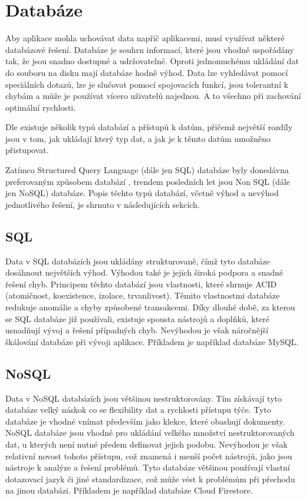 \section{Databáze}

Aby aplikace mohla uchovávat data napříč aplikacemi,
musí využívat některé databázové řešení.
Databáze je souhrn informací,
které jsou vhodně uspořádány tak,
že jsou snadno dostupné a udržovatelné.
Oproti jednomuchému ukládání dat do souboru na disku mají databáze hodně výhod.
Data lze vyhledávat pomocí speciálních dotazů,
lze je slučovat pomocí spojovacích funkcí,
jsou tolerantní k chybám
a může je používat vícero uživatelů najednou.
A to všechno při zachování optimální rychlosti.
\cite{database}

Dle \cite{sql_nosql} existuje několik typů databází a přístupů k datům,
přičemž největší rozdíly jsou v tom,
jak ukládají který typ dat,
a jak je k těmto datům umožněno přistupovat.
\cite{sql_nosql}

Zatímco Structured Query Language (dále jen SQL) databáze byly donedávna
preferovaným způsobem databází \cite{sql_nosql},
trendem posledních let jsou Non SQL (dále jen NoSQL) databáze.
Popis těchto typů databází,
včetně výhod a nevýhod jednotlivého řešení,
je shrnuto v následujících sekcích.

\subsection{SQL}

Data v SQL databázích jsou ukládány strukturovaně,
čímž tyto databáze dosáhnout největších výhod.
Výhodou také je jejich široká podpora a snadné řešení chyb.
Principem těchto databází jsou vlastnosti,
které shrnuje ACID (atomičnost, koexistence, izolace, trvanlivost).
Těmito vlastnostmi databáze redukuje anomálie a chyby způsobené transakcemi.
Díky dlouhé době,
za kterou se SQL databáze již používali,
existuje spousta nástrojů a doplňků,
které usnadňují vývoj a řešení případných chyb.
Nevýhodou je však náročnější škálování databáze při vývoji aplikace.
Příkladem je například databáze MySQL.
\cite{sql_nosql}

\subsection{NoSQL}

Data v NoSQL databázích jsou většinou nestruktorovány.
Tím získávají tyto databáze velký náskok co se flexibility dat a rychlosti
přístupu týče.
Tyto databáze je vhodné vnímat především jako klekce,
které obashují dokumenty. 
NoSQL databáze jsou vhodné pro ukládání velkého množství nestruktorovaných dat,
u kterých není nutné předem definovat jejich podobu.
Nevýhodou je však relativní novost tohoto přístupu,
což znamená i menší počet nástrojů,
jako jsou nástroje k analýze a řešení problémů.
Tyto databáze většinou používají vlastní dotazovací jazyk či jiné standardizace,
což může vést k problémům při přechodu na jinou databázi.
\cite{sql_nosql}
Příkladem je například databáze Cloud Firestore.
\cite{cloud_firestore}


